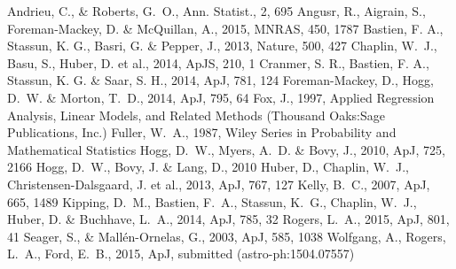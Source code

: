 \documentclass[apjl]{emulateapj}
\begin{document}
\begin{thebibliography}{99}
Andrieu, C., \& Roberts, G.~O., Ann. Statist., 2, 695
Angusr, R., Aigrain, S., Foreman-Mackey, D. \& McQuillan, A., 2015, MNRAS,
450, 1787
 Bastien,
F. A., Stassun, K. G., Basri, G. \& Pepper, J., 2013, Nature, 500, 427
Chaplin, W.~J., Basu, S., Huber, D. et al., 2014, ApJS, 210, 1
Cranmer, S. R., Bastien, F. A., Stassun, K. G. \& Saar, S. H., 2014, ApJ, 781,
124
 Foreman-Mackey, D., Hogg, D.~W. \& Morton, T.~D., 2014,
ApJ, 795, 64
Fox, J., 1997, Applied Regression Analysis, Linear Models, and Related Methods
(Thousand Oaks:Sage Publications, Inc.)
Fuller, W.~A., 1987, Wiley Series in Probability and Mathematical Statistics
Hogg, D.~W., Myers, A.~D. \& Bovy, J., 2010, ApJ, 725,
2166
Hogg, D.~W., Bovy, J. \& Lang, D., 2010
Huber, D., Chaplin, W.~J., Christensen-Dalsgaard, J. et al., 2013, ApJ, 767,
127
 Kelly, B.~C., 2007,
ApJ, 665, 1489
Kipping, D.~M., Bastien, F.~A., Stassun, K.~G., Chaplin, W.~J., Huber, D. \&
Buchhave, L.~A., 2014, ApJ, 785, 32
Rogers, L.~A., 2015, ApJ, 801, 41
Seager, S., \& Mall\'{e}n-Ornelas, G., 2003, ApJ, 585, 1038
Wolfgang, A., Rogers, L.~A., Ford, E.~B., 2015, ApJ, submitted
(astro-ph:1504.07557)
\end{thebibliography}
\end{document}
